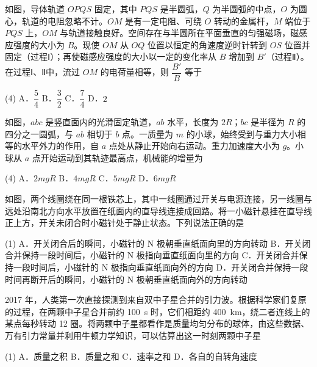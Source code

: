 \begin{question}
如图，导体轨道 $OPQS$ 固定，其中 $PQS$ 是半圆弧，$Q$ 为半圆弧的中点，$O$ 为圆心，轨道的电阻忽略不计。$OM$ 是有一定电阻、可绕 $O$ 转动的金属杆，$M$ 端位于 $PQS$ 上，$OM$ 与轨道接触良好。空间存在与半圆所在平面垂直的匀强磁场，磁感应强度的大小为 $B$。现使 $OM$ 从 $OQ$ 位置以恒定的角速度逆时针转到 $OS$ 位置并固定（过程Ⅰ）；再使磁感应强度的大小以一定的变化率从 $B$ 增加到 $B'$（过程Ⅱ）。在过程Ⅰ、Ⅱ中，流过 $OM$ 的电荷量相等，则 $\dfrac{B'}{B}$ 等于\gkblank


\begin{gkopts}(4)
  \task A．$\dfrac{5}{4}$
  \task B．$\dfrac{3}{2}$
  \task C．$\dfrac{7}{4}$
  \task D．$2$
\end{gkopts}
\end{question}

\begin{question}
如图，$abc$ 是竖直面内的光滑固定轨道，$ab$ 水平，长度为 $2R$；$bc$ 是半径为 $R$ 的四分之一圆弧，与 $ab$ 相切于 $b$ 点。一质量为 $m$ 的小球，始终受到与重力大小相等的水平外力的作用，自 $a$ 点处从静止开始向右运动。重力加速度大小为 $g$。小球从 $a$ 点开始运动到其轨迹最高点，机械能的增量为\gkblank


\begin{gkopts}(4)
  \task A．$2mgR$
  \task B．$4mgR$
  \task C．$5mgR$
  \task D．$6mgR$
\end{gkopts}
\end{question}

\begin{question}
如图，两个线圈绕在同一根铁芯上，其中一线圈通过开关与电源连接，另一线圈与远处沿南北方向水平放置在纸面内的直导线连接成回路。将一小磁针悬挂在直导线正上方，开关未闭合时小磁针处于静止状态。下列说法正确的是\gkblank


\begin{gkopts}(1)
  \task A．开关闭合后的瞬间，小磁针的 N 极朝垂直纸面向里的方向转动
  \task B．开关闭合并保持一段时间后，小磁针的 N 极指向垂直纸面向里的方向
  \task C．开关闭合并保持一段时间后，小磁针的 N 极指向垂直纸面向外的方向
  \task D．开关闭合并保持一段时间再断开后的瞬间，小磁针的 N 极朝垂直纸面向外的方向转动
\end{gkopts}
\end{question}

\begin{question}
2017 年，人类第一次直接探测到来自双中子星合并的引力波。根据科学家们复原的过程，在两颗中子星合并前约 \SI{100}{\second} 时，它们相距约 \SI{400}{\kilo\metre}，绕二者连线上的某点每秒转动 12 圈。将两颗中子星都看作是质量均匀分布的球体，由这些数据、万有引力常量并利用牛顿力学知识，可以估算出这一时刻两颗中子星\gkblank

\begin{gkopts}(1)
  \task A．质量之积
  \task B．质量之和
  \task C．速率之和
  \task D．各自的自转角速度
\end{gkopts}
\end{question}

